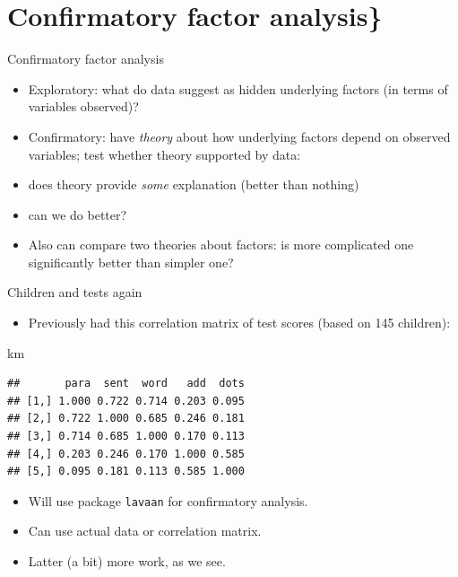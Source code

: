 \documentclass[
  ignorenonframetext,
]{beamer}
\newenvironment{Shaded}{\begin{snugshade}}{\end{snugshade}}
\newcommand{\NormalTok}[1]{#1}
\providecommand{\tightlist}{%
  \setlength{\itemsep}{0pt}\setlength{\parskip}{0pt}}
\begin{document}
\hypertarget{confirmatory-factor-analysis}{%
\section{Confirmatory factor
analysis\}}\label{confirmatory-factor-analysis}}

\begin{frame}{Confirmatory factor analysis}
\protect\hypertarget{confirmatory-factor-analysis-1}{}

\begin{itemize}
\item
  Exploratory: what do data suggest as hidden underlying factors (in
  terms of variables observed)?
\item
  Confirmatory: have \emph{theory} about how underlying factors depend
  on observed variables; test whether theory supported by data:
\item
  does theory provide \emph{some} explanation (better than nothing)
\item
  can we do better?
\item
  Also can compare two theories about factors: is more complicated one
  significantly better than simpler one?
\end{itemize}

\end{frame}

\begin{frame}[fragile]{Children and tests again}
\protect\hypertarget{children-and-tests-again}{}

\begin{itemize}
\tightlist
\item
  Previously had this correlation matrix of test scores (based on 145
  children):
\end{itemize}

\begin{Shaded}
\begin{Highlighting}[]
\NormalTok{km}
\end{Highlighting}
\end{Shaded}

\begin{verbatim}
##       para  sent  word   add  dots
## [1,] 1.000 0.722 0.714 0.203 0.095
## [2,] 0.722 1.000 0.685 0.246 0.181
## [3,] 0.714 0.685 1.000 0.170 0.113
## [4,] 0.203 0.246 0.170 1.000 0.585
## [5,] 0.095 0.181 0.113 0.585 1.000
\end{verbatim}

\begin{itemize}
\item
  Will use package \texttt{lavaan} for confirmatory analysis.
\item
  Can use actual data or correlation matrix.
\item
  Latter (a bit) more work, as we see.
\end{itemize}

\end{frame}
\end{document}
